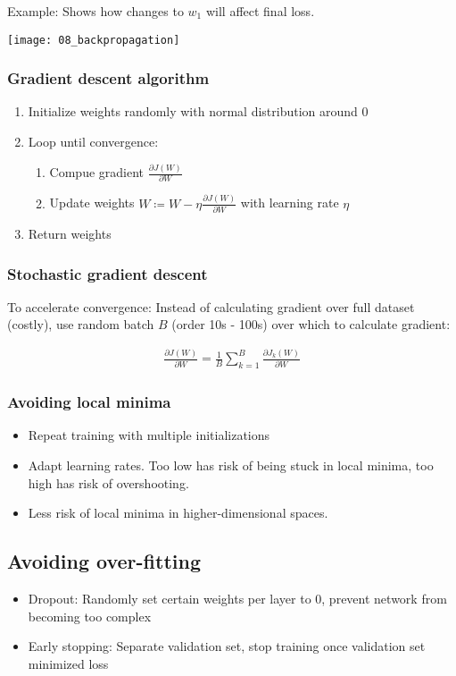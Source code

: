 Example: Shows how changes to $w_1$ will affect final loss.

\texttt{[image: 08\_backpropagation]}

\subsubsection{Gradient descent algorithm}

\begin{enumerate}
		\item Initialize weights randomly with normal distribution around $0$
		\item Loop until convergence:
				\begin{enumerate}
						\item Compue gradient $\frac{\partial J(W)}{\partial W}$
						\item Update weights $W \coloneqq W - \eta
								\frac{\partial J(W)}{\partial W}$ with learning
								rate $\eta$
				\end{enumerate}
		\item Return weights
\end{enumerate}

\subsubsection{Stochastic gradient descent}

To accelerate convergence: Instead of calculating gradient over full dataset
(costly), use random batch $B$ (order 10s - 100s) over which to calculate
gradient:

\begin{align*}
		\frac{\partial J(W)}{\partial W} = \frac{1}{B} \sum_{k = 1}^B \frac{\partial J_k(W)}{\partial W}
\end{align*}

\subsubsection{Avoiding local minima}

\begin{itemize}
		\item Repeat training with multiple initializations
		\item Adapt learning rates. Too low has risk of being stuck in local
				minima, too high has risk of overshooting.
		\item Less risk of local minima in higher-dimensional spaces.
\end{itemize}

\subsection{Avoiding over-fitting}

\begin{itemize}
		\item Dropout: Randomly set certain weights per layer to 0, prevent
				network from becoming too complex
		\item Early stopping: Separate validation set, stop training once
				validation set minimized loss
\end{itemize}
